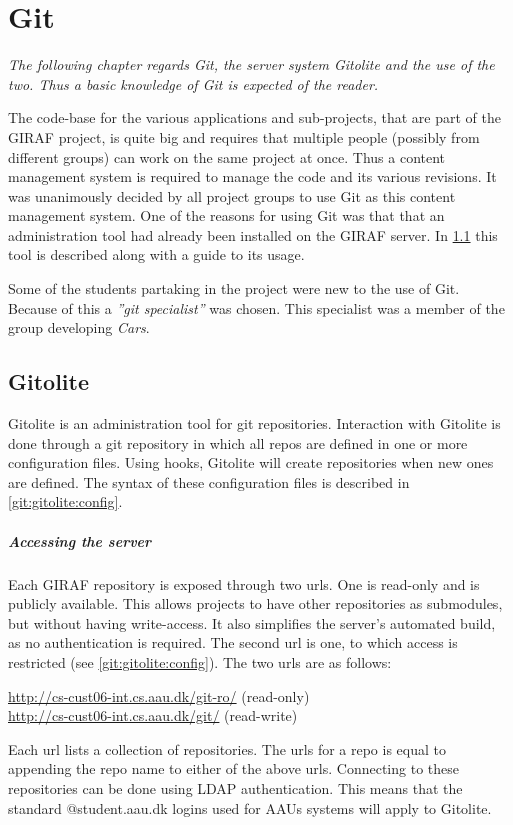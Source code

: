\chapter{Git}\label{collaboration:git}
\newcommand{\git}{Git}\newcommand{\Git}{Git}
\newcommand{\gitolite}{Gitolite}\newcommand{\Gitolite}{Gitolite}
\begin{center}
\textit{The following chapter regards \git{}, the server system \gitolite{} and the use of the two.
Thus a basic knowledge of \git{} is expected of the reader.}
\end{center}
The code-base for the various applications and sub-projects, that are part of the GIRAF project, is quite big and requires that multiple people (possibly from different groups) can work on the same project at once.
Thus a content management system is required to manage the code and its various revisions. 
It was unanimously decided by all project groups to use \git{} as this content management system.
One of the reasons for using \git{} was that that an administration tool had already been installed on the GIRAF server.
In \cref{git:gitolite} this tool is described along with a guide to its usage.

Some of the students partaking in the project were new to the use of \git{}.
Because of this a \textit{''git specialist''} was chosen.
This specialist was a member of the group developing \textit{Cars}.

\section{\Gitolite{}}\label{git:gitolite}
\Gitolite{} is an administration tool for git repositories.
Interaction with \gitolite{} is done through a git repository in which all repos are defined in one or more configuration files.
Using hooks, \gitolite{} will create repositories when new ones are defined.
The syntax of these configuration files is described in \cref{git:gitolite:config}.

\paragraph{Accessing the server}
Each GIRAF repository is exposed through two urls.
One is read-only and is publicly available.
This allows projects to have other repositories as submodules, but without having write-access.
It also simplifies the server's automated build, as no authentication is required.
The second url is one, to which access is restricted (see \cref{git:gitolite:config}).
The two urls are as follows:
\begin{center}
\url{http://cs-cust06-int.cs.aau.dk/git-ro/} (read-only)\\
\url{http://cs-cust06-int.cs.aau.dk/git/} (read-write)
\end{center}
Each url lists a collection of repositories.
The urls for a repo is equal to appending the repo name to either of the above urls.
Connecting to these repositories can be done using LDAP authentication.
This means that the standard @student.aau.dk logins used for AAUs systems will apply to \gitolite{}.

